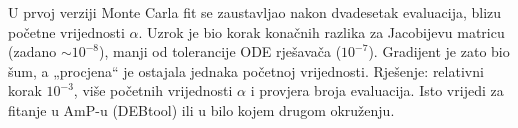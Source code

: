 \begin{upozorenje}
U prvoj verziji Monte Carla fit se zaustavljao nakon dvadesetak evaluacija, blizu početne vrijednosti $\alpha$. Uzrok je bio korak konačnih razlika za Jacobijevu matricu (zadano $\sim10^{-8}$), manji od tolerancije ODE rješavača ($10^{-7}$). Gradijent je zato bio šum, a „procjena“ je ostajala jednaka početnoj vrijednosti. Rješenje: relativni korak $10^{-3}$, više početnih vrijednosti $\alpha$ i provjera broja evaluacija. Isto vrijedi za fitanje u AmP-u (DEBtool) ili u bilo kojem drugom okruženju.
\end{upozorenje}
